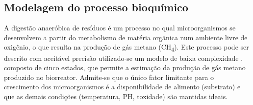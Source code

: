\documentclass[a0,portrait]{a0poster}
\begin{document}
\begin{multicols}{2}
\section*{Modelagem do processo bioquímico}

\quad A digestão anaeróbica de resíduos é um processo no qual microorganismos se desenvolvem a partir do metabolismo de matéria orgânica num ambiente livre de oxigênio, o que resulta na produção de gás metano (CH\textsubscript{4}). Este processo pode ser descrito com aceitável precisão utilizado-se um modelo de baixa complexidade %
, composto de cinco estados, que permite a estimação da produção de gás metano produzido no biorreator. Admite-se que o único fator limitante para o crescimento dos microorganismos é a disponibilidade de alimento (substrato) e que as demais condições (temperatura, PH, toxidade) são mantidas ideais. 


\end{multicols}
\end{document}
